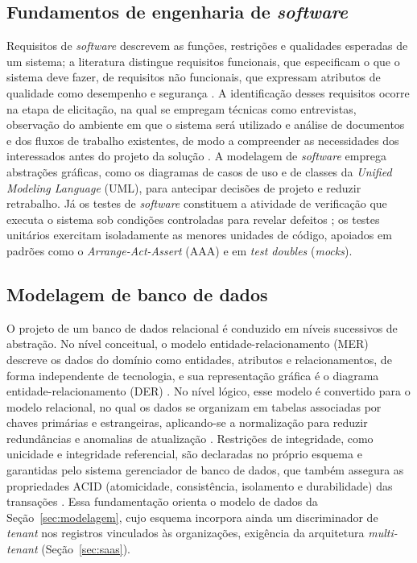 \documentclass[a4paper,12pt]{article}
\begin{document}
\subsection{Fundamentos de engenharia de \textit{software}}

Requisitos de \textit{software} descrevem as funções, restrições e qualidades esperadas de um sistema; a literatura distingue requisitos funcionais, que especificam o que o sistema deve fazer, de requisitos não funcionais, que expressam atributos de qualidade como desempenho e segurança \cite{sommerville2011, pressman2016}. A identificação desses requisitos ocorre na etapa de elicitação, na qual se empregam técnicas como entrevistas, observação do ambiente em que o sistema será utilizado e análise de documentos e dos fluxos de trabalho existentes, de modo a compreender as necessidades dos interessados antes do projeto da solução \cite{sommerville2011}. A modelagem de \textit{software} emprega abstrações gráficas, como os diagramas de casos de uso e de classes da \textit{Unified Modeling Language} (UML), para antecipar decisões de projeto e reduzir retrabalho. Já os testes de \textit{software} constituem a atividade de verificação que executa o sistema sob condições controladas para revelar defeitos \cite{pressman2016}; os testes unitários exercitam isoladamente as menores unidades de código, apoiados em padrões como o \textit{Arrange-Act-Assert} (AAA) e em \textit{test doubles} (\textit{mocks}).

\subsection{Modelagem de banco de dados}
\label{sec:modelagembd}

O projeto de um banco de dados relacional é conduzido em níveis sucessivos de abstração. No nível conceitual, o modelo entidade-relacionamento (MER) descreve os dados do domínio como entidades, atributos e relacionamentos, de forma independente de tecnologia, e sua representação gráfica é o diagrama entidade-relacionamento (DER) \cite{heuser2009}. No nível lógico, esse modelo é convertido para o modelo relacional, no qual os dados se organizam em tabelas associadas por chaves primárias e estrangeiras, aplicando-se a normalização para reduzir redundâncias e anomalias de atualização \cite{elmasri2018}. Restrições de integridade, como unicidade e integridade referencial, são declaradas no próprio esquema e garantidas pelo sistema gerenciador de banco de dados, que também assegura as propriedades ACID (atomicidade, consistência, isolamento e durabilidade) das transações \cite{elmasri2018}. Essa fundamentação orienta o modelo de dados da Seção~\ref{sec:modelagem}, cujo esquema incorpora ainda um discriminador de \textit{tenant} nos registros vinculados às organizações, exigência da arquitetura \textit{multi-tenant} (Seção~\ref{sec:saas}).
\end{document}
